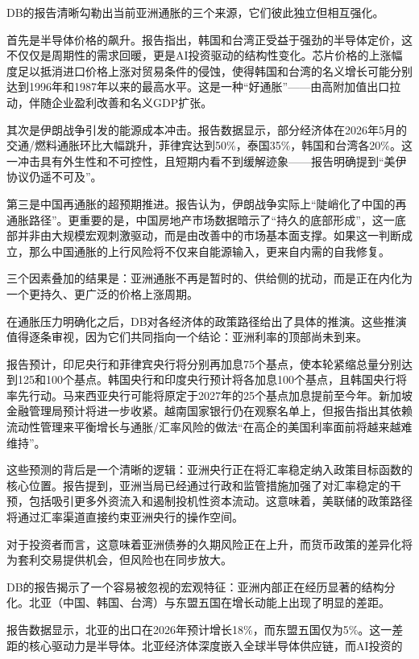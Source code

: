 \documentclass[11pt]{ctexart}
\begin{document}
DB的报告清晰勾勒出当前亚洲通胀的三个来源，它们彼此独立但相互强化。

首先是半导体价格的飙升。报告指出，韩国和台湾正受益于强劲的半导体定价，这不仅仅是周期性的需求回暖，更是AI投资驱动的结构性变化。芯片价格的上涨幅度足以抵消进口价格上涨对贸易条件的侵蚀，使得韩国和台湾的名义增长可能分别达到1996年和1987年以来的最高水平。这是一种“好通胀”——由高附加值出口拉动，伴随企业盈利改善和名义GDP扩张。

其次是伊朗战争引发的能源成本冲击。报告数据显示，部分经济体在2026年5月的交通/燃料通胀环比大幅跳升，菲律宾达到50\%，泰国35\%，韩国和台湾各20\%。这一冲击具有外生性和不可控性，且短期内看不到缓解迹象——报告明确提到“美伊协议仍遥不可及”。

第三是中国再通胀的超预期推进。报告认为，伊朗战争实际上“陡峭化了中国的再通胀路径”。更重要的是，中国房地产市场数据暗示了“持久的底部形成”，这一底部并非由大规模宏观刺激驱动，而是由改善中的市场基本面支撑。如果这一判断成立，那么中国通胀的上行风险将不仅来自能源输入，更来自内需的自我修复。

三个因素叠加的结果是：亚洲通胀不再是暂时的、供给侧的扰动，而是正在内化为一个更持久、更广泛的价格上涨周期。

在通胀压力明确化之后，DB对各经济体的政策路径给出了具体的推演。这些推演值得逐条审视，因为它们共同指向一个结论：亚洲利率的顶部尚未到来。

报告预计，印尼央行和菲律宾央行将分别再加息75个基点，使本轮紧缩总量分别达到125和100个基点。韩国央行和印度央行预计将各加息100个基点，且韩国央行将率先行动。马来西亚央行可能将原定于2027年的25个基点加息提前至今年。新加坡金融管理局预计将进一步收紧。越南国家银行仍在观察名单上，但报告指出其依赖流动性管理来平衡增长与通胀/汇率风险的做法“在高企的美国利率面前将越来越难维持”。

这些预测的背后是一个清晰的逻辑：亚洲央行正在将汇率稳定纳入政策目标函数的核心位置。报告提到，亚洲当局已经通过行政和监管措施加强了对汇率稳定的干预，包括吸引更多外资流入和遏制投机性资本流动。这意味着，美联储的政策路径将通过汇率渠道直接约束亚洲央行的操作空间。

对于投资者而言，这意味着亚洲债券的久期风险正在上升，而货币政策的差异化将为套利交易提供机会，但风险也在同步放大。

DB的报告揭示了一个容易被忽视的宏观特征：亚洲内部正在经历显著的结构分化。北亚（中国、韩国、台湾）与东盟五国在增长动能上出现了明显的差距。

报告数据显示，北亚的出口在2026年预计增长18\%，而东盟五国仅为5\%。这一差距的核心驱动力是半导体。北亚经济体深度嵌入全球半导体供应链，而AI投资的
\end{document}
